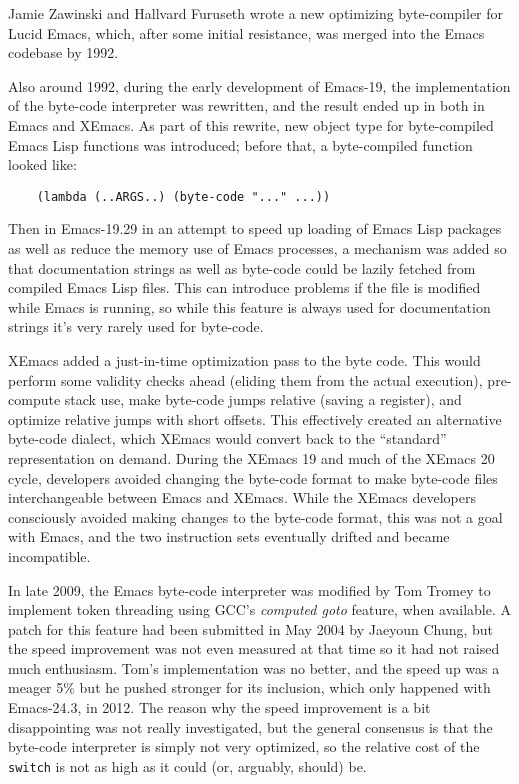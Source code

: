 \documentclass[format=acmsmall, review]{acmart}
\newcommand \Elisp {Emacs Lisp}
\begin{document}
Jamie Zawinski and Hallvard Furuseth wrote a new optimizing
byte-compiler for Lucid Emacs, which, after some initial resistance, was
merged into the Emacs codebase by 1992.

Also around 1992, during the early development of Emacs-19, the
implementation of the byte-code interpreter was rewritten, and the
result ended up in both in Emacs and XEmacs.
As part of this rewrite, new object type for byte-compiled \Elisp{}
functions was introduced; before that, a byte-compiled function looked
like:
\begin{verbatim}
    (lambda (..ARGS..) (byte-code "..." ...))
\end{verbatim}
Then in Emacs-19.29 in an attempt to speed up loading of \Elisp{} packages
as well as reduce the memory use of Emacs processes, a mechanism was added
so that documentation strings as well as byte-code could be lazily fetched
from compiled \Elisp{} files.  This can introduce problems if the file is
modified while Emacs is running, so while this feature is always used
for documentation strings it's very rarely used for byte-code.


XEmacs added a just-in-time optimization pass to the byte code.  This
would perform some validity checks ahead (eliding them from the actual
execution), pre-compute stack use, make byte-code jumps relative
(saving a register), and optimize relative jumps with short offsets.
This effectively created an alternative byte-code dialect, which
XEmacs would convert back to the ``standard'' representation on
demand.
During the XEmacs 19 and much of the XEmacs 20 cycle, developers
avoided changing the byte-code format to make byte-code files
interchangeable between Emacs and XEmacs.  While
the XEmacs developers consciously avoided making changes to the
byte-code format, this was not a goal with Emacs, and the two
instruction sets eventually drifted and became incompatible.

In late 2009, the Emacs byte-code interpreter was modified by Tom Tromey to
implement token threading using GCC's \emph{computed goto} feature, when
available.  A patch for this feature had been submitted in May 2004 by
Jaeyoun Chung, but the speed improvement was not even measured at that time
so it had not raised much enthusiasm.  Tom's implementation was no better,
and the speed up was a meager 5\% but he pushed stronger for its inclusion,
which only happened with Emacs-24.3, in 2012.  The reason why the speed
improvement is a bit disappointing was not really investigated, but the
general consensus is that the byte-code interpreter is simply not very
optimized, so the relative cost of the \texttt{switch} is not as high as it
could (or, arguably, should) be.
\end{document}

